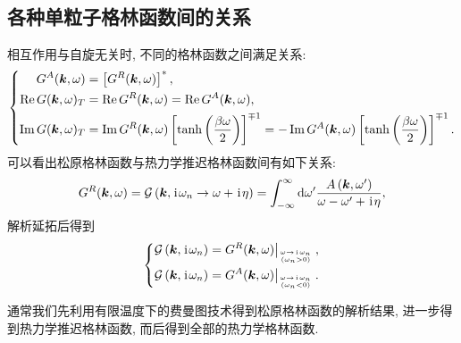 \subsection{各种单粒子格林函数间的关系}
相互作用与自旋无关时, 不同的格林函数之间满足关系:
\begin{equation}
\left\{\begin{aligned}
G^A(\boldsymbol{k}, \omega)&=\left[G^R(\boldsymbol{k}, \omega)\right]^*,\\
\operatorname{Re} G(\boldsymbol{k}, \omega)_T&=\operatorname{Re} G^R(\boldsymbol{k}, \omega)=\operatorname{Re} G^A(\boldsymbol{k}, \omega), \\
\operatorname{Im} G(\boldsymbol{k}, \omega)_T&=\operatorname{Im} G^R(\boldsymbol{k}, \omega)\left[\tanh\left(\frac{\beta \omega}{2}\right)\right] ^{\mp 1}=-\operatorname{Im} G^A(\boldsymbol{k}, \omega) \left[\tanh\left(\frac{\beta \omega}{2}\right)\right] ^{\mp 1} .
\end{aligned}\right.
\end{equation}
可以看出松原格林函数与热力学推迟格林函数间有如下关系:
\begin{equation}
G^R(\boldsymbol{k}, \omega)=\mathcal{G}\left(\boldsymbol{k}, \hspace{0.1em}\mathrm{i}\hspace{0.1em} \omega_n \rightarrow \omega+\hspace{0.1em}\mathrm{i}\hspace{0.1em} \eta\right)=\int_{-\infty}^{\infty} \mathrm{d} \omega^{\prime} \frac{A\left(\boldsymbol{k}, \omega^{\prime}\right)}{\omega-\omega^{\prime}+\hspace{0.1em}\mathrm{i}\hspace{0.1em} \eta},
\end{equation}
解析延拓后得到
\begin{equation}
\left\{\begin{aligned}
\mathcal{G}\left(\boldsymbol{k}, \hspace{0.1em}\mathrm{i}\hspace{0.1em} \omega_n \right)&\left.=G^R(\boldsymbol{k}, \omega)\right|_{\omega\to\hspace{0.1em}\mathrm{i}\hspace{0.1em}\omega_n \atop(\omega_n>0)},\\
\mathcal{G}\left(\boldsymbol{k}, \hspace{0.1em}\mathrm{i}\hspace{0.1em} \omega_n \right)&\left.=G^A(\boldsymbol{k}, \omega)\right|_{\omega\to\hspace{0.1em}\mathrm{i}\hspace{0.1em}\omega_n \atop(\omega_n<0)}.
\end{aligned}\right.
\end{equation}

通常我们先利用有限温度下的费曼图技术得到松原格林函数的解析结果, 进一步得到热力学推迟格林函数, 而后得到全部的热力学格林函数.

